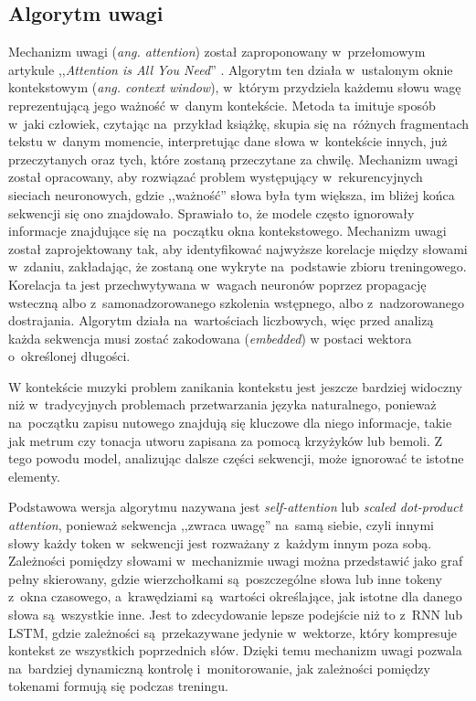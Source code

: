 \documentclass[data-science]{agh-wi} %
\begin{document}
\subsection{Algorytm uwagi}
\label{sec:attention}
Mechanizm uwagi (\textit{ang. attention}) został zaproponowany w~przełomowym artykule ,,\textit{Attention is All You Need}'' \cite{attention}. Algorytm ten działa w~ustalonym oknie kontekstowym (\textit{ang. context window}), w~którym przydziela każdemu słowu wagę reprezentującą jego ważność w~danym kontekście. Metoda ta imituje sposób w~jaki człowiek, czytając na~przykład książkę, skupia się na~różnych fragmentach tekstu w~danym momencie, interpretując dane słowa w~kontekście innych, już przeczytanych oraz tych, które zostaną przeczytane za chwilę. Mechanizm uwagi został opracowany, aby rozwiązać problem występujący w~rekurencyjnych sieciach neuronowych, gdzie ,,ważność'' słowa była tym większa, im bliżej końca sekwencji się ono znajdowało. Sprawiało to, że modele często ignorowały informacje znajdujące się na~początku okna kontekstowego. Mechanizm uwagi został zaprojektowany tak, aby identyfikować najwyższe korelacje między słowami w~zdaniu, zakładając, że zostaną one wykryte na~podstawie zbioru treningowego. Korelacja ta jest przechwytywana w~wagach neuronów poprzez propagację wsteczną albo z~samonadzorowanego szkolenia wstępnego, albo z~nadzorowanego dostrajania. Algorytm działa na~wartościach liczbowych, więc przed analizą każda sekwencja musi zostać zakodowana (\textit{embedded}) w postaci wektora o~określonej długości.

W kontekście muzyki problem zanikania kontekstu jest jeszcze bardziej widoczny niż w~tradycyjnych problemach przetwarzania języka naturalnego, ponieważ na~początku zapisu nutowego znajdują się kluczowe dla niego informacje, takie jak metrum czy tonacja utworu zapisana za pomocą krzyżyków lub bemoli. Z tego powodu model, analizując dalsze części sekwencji, może ignorować te istotne elementy.

Podstawowa wersja algorytmu nazywana jest \textit{self-attention} lub \textit{scaled dot-product attention}, ponieważ sekwencja ,,zwraca uwagę'' na~samą siebie, czyli innymi słowy każdy token  w~sekwencji jest rozważany z~każdym innym poza sobą. Zależności pomiędzy słowami w~mechanizmie uwagi można przedstawić jako graf pełny skierowany, gdzie wierzchołkami są~poszczególne słowa lub inne tokeny z~okna czasowego, a~krawędziami są~wartości określające, jak istotne dla danego słowa są~wszystkie inne. Jest to zdecydowanie lepsze podejście niż to z~RNN lub LSTM, gdzie zależności są~przekazywane jedynie w~wektorze, który kompresuje kontekst ze wszystkich poprzednich słów. Dzięki temu mechanizm uwagi pozwala na~bardziej dynamiczną kontrolę i~monitorowanie, jak zależności pomiędzy tokenami formują się podczas treningu.
\end{document}
